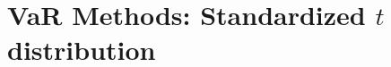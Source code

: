 %
%
%
%
%
%
%
%
%
%
\section[$t$ Distribution]{VaR Methods: Standardized $t$ distribution}\subsection*{}

